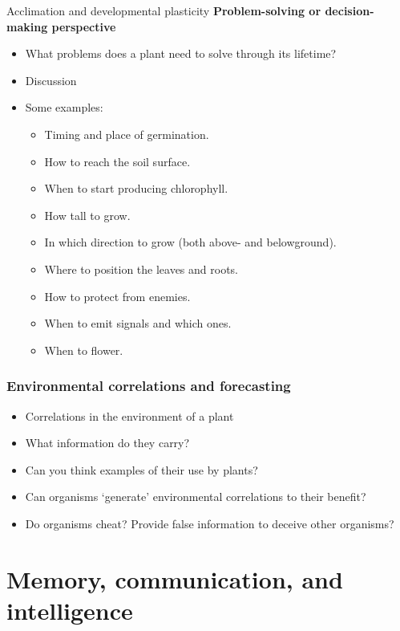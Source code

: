 \documentclass[10pt]{beamer}
\newcommand\webglyphs[1]{{\webglyphsfont\symbol{#1}}}
\newcommand\Discussion{\colorbox{white}{\textcolor{black}{\webglyphs{"F134}}}\xspace}
\begin{document}
\begin{frame}{Acclimation and developmental plasticity}
\textbf{Problem-solving or decision-making perspective}
    \begin{itemize}
      \item What problems does a plant need to solve through its lifetime?
      \item Discussion
      \item Some examples:
        \begin{itemize}
          \item Timing and place of germination.
          \item How to reach the soil surface.
          \item When to start producing chlorophyll.
          \item How tall to grow.
          \item In which direction to grow (both above- and belowground).
          \item Where to position the leaves and roots.
          \item How to protect from enemies.
          \item When to emit signals and which ones.
          \item When to flower.
        \end{itemize}
    \end{itemize}
\end{frame}

\begin{frame}
  \frametitle{Environmental correlations and forecasting \Discussion}
  \begin{itemize}
    \item Correlations in the environment of a plant
    \item What information do they carry?
    \item Can you think examples of their use by plants?
    \item Can organisms `generate' environmental correlations to their benefit?
    \item Do organisms cheat? Provide false information to deceive other organisms?
  \end{itemize}
\end{frame}

\section{Memory, communication, and intelligence}
\end{document}
